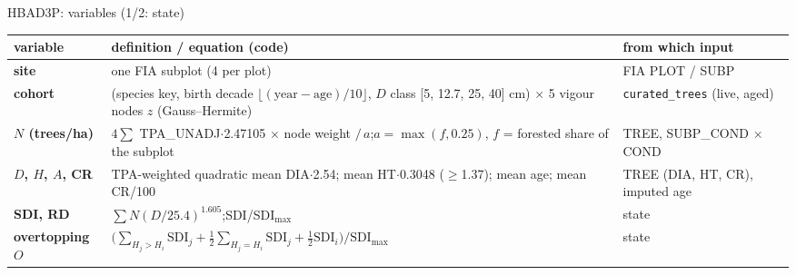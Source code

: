 \begin{frame}{HBAD3P: variables (1/2: state)}
\scriptsize
\renewcommand{\arraystretch}{1.07}
\begin{tabularx}{\textwidth}{@{}>{\bfseries}p{2.3cm}X>{\raggedright\arraybackslash}p{3.9cm}@{}}
\toprule
variable & definition / equation (code) & from which input \\
\midrule
site & one FIA subplot (4 per plot) & FIA PLOT / SUBP \\
cohort & (species key, birth decade $\lfloor(\text{year}-\text{age})/10\rfloor$, $D$ class [5, 12.7, 25, 40] cm) $\times$ 5 vigour nodes $z$ (Gauss–Hermite) & \texttt{curated\_trees} (live, aged) \\
$N$ (trees/ha) & $4\sum$ TPA\_UNADJ$\cdot$2.47105 $\times$ node weight $/\,a$;\quad $a=\max(f,0.25)$, $f$ = forested share of the subplot & TREE, SUBP\_COND $\times$ COND \\
$D$, $H$, $A$, CR & TPA-weighted quadratic mean DIA$\cdot$2.54; mean HT$\cdot$0.3048 ($\ge$1.37); mean age; mean CR/100 & TREE (DIA, HT, CR), imputed age \\
SDI, RD & $\sum N(D/25.4)^{1.605}$;\quad SDI/SDI$_{\max}$ & state \\
overtopping $O$ & $\bigl(\sum_{H_j>H_i}\text{SDI}_j+\frac12\sum_{H_j=H_i}\text{SDI}_j+\frac12\text{SDI}_i\bigr)/\text{SDI}_{\max}$ & state \\
\bottomrule
\end{tabularx}
\end{frame}

